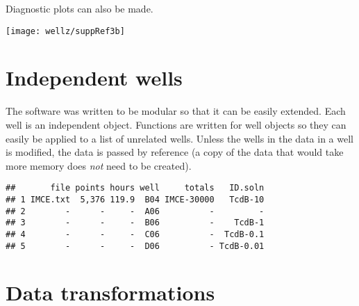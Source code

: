 Diagnostic plots can also be made.

\begin{knitrout}
\color{fgcolor}\begin{kframe}
\begin{alltt}
  \hlstd{=} \hlstd{,}
     \hlstd{=} \hlstd{,}  \hlstd{=} \hlstd{)}
\end{alltt}
\end{kframe}
\texttt{[image: wellz/suppRef3b]} 

\end{knitrout}
\section{Independent wells}
The software was written to be modular so that it can be easily extended.
Each well is an independent object. Functions are written for well objects
so they can easily be applied to a list of unrelated wells. Unless the
wells in the data in a well is modified, the data is passed by reference
(a copy of the data that would take more memory does \textit{not} need to be created).

\begin{knitrout}
\color{fgcolor}\begin{kframe}
\begin{alltt}
 \hlkwb{=} \hlstd{subset[}\hlstd{]}
 \hlkwb{=} \hlstd{subset[}\hlopt{:}\hlstd{]}
 \hlkwb{=} 
\end{alltt}
\begin{verbatim}
##       file points hours well     totals   ID.soln
## 1 IMCE.txt  5,376 119.9  B04 IMCE-30000   TcdB-10
## 2        -      -     -  A06          -         -
## 3        -      -     -  B06          -    TcdB-1
## 4        -      -     -  C06          -  TcdB-0.1
## 5        -      -     -  D06          - TcdB-0.01
\end{verbatim}
\end{kframe}
\end{knitrout}

\section{Data transformations}

